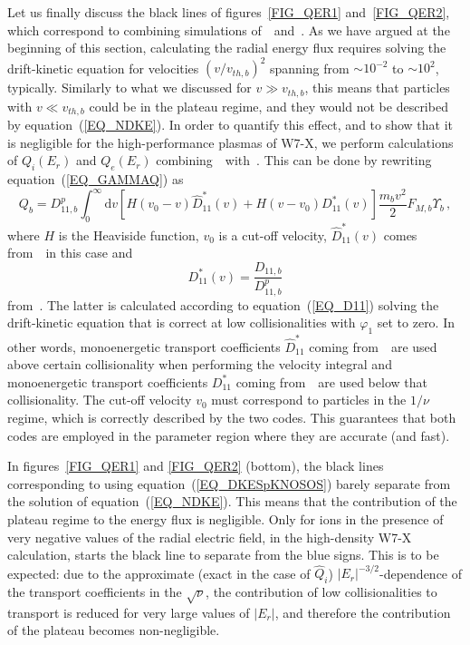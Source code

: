 Let us finally discuss the black lines of figures~\ref{FIG_QER1} and~\ref{FIG_QER2}, which correspond to combining simulations of~\DKES~and~\KNOSOS. As we have argued at the beginning of this section, calculating the radial energy flux requires solving the drift-kinetic equation for velocities $(v/v_{th,b})^2$ spanning from $\sim 10^{-2}$ to $\sim 10^{2}$, typically. Similarly to what we discussed for $v\gg v_{th,b}$, this means that particles with $v\ll v_{th,b}$ could be in the plateau regime, and they would not be described by equation~(\ref{EQ_NDKE}). In order to quantify this effect, and to show that it is negligible for the high-performance plasmas of W7-X, we perform calculations of $Q_i(E_r)$ and $Q_e(E_r)$ combining~\KNOSOS~with~\DKES. This can be done by rewriting equation~(\ref{EQ_GAMMAQ}) as
\begin{equation}
Q_b = D_{11,b}^p\int_0^\infty\mathrm{d} v \left[ H(v_0-v) \hat D^*_{11}(v) + H(v-v_0) D^*_{11}(v) \right] \frac{m_bv^2}{2}  F_{M,b} \Upsilon_b\,,
\label{EQ_DKESpKNOSOS}
\end{equation}
where $H$ is the Heaviside function, $v_0$ is a cut-off velocity, $\hat D^*_{11}(v)$ comes from~\DKES~in this case and
\begin{equation}
D^*_{11}(v) = \frac{D_{11,b}}{D_{11,b}^p}
\end{equation}
from~\KNOSOS. The latter is calculated according to equation~(\ref{EQ_D11}) solving the drift-kinetic equation that is correct at low collisionalities with $\varphi_1$ set to zero. In other words, monoenergetic transport coefficients $\hat D^*_{11}$ coming from~\DKES~are used above certain collisionality when performing the velocity integral and monoenergetic transport coefficients $D^*_{11}$ coming from~\KNOSOS~are used below that collisionality. The cut-off velocity $v_0$ must correspond to particles in the $1/\nu$ regime, which is correctly described by the two codes. This guarantees that both codes are employed in the parameter region where they are accurate (and fast).

In figures~\ref{FIG_QER1} and \ref{FIG_QER2} (bottom), the black lines corresponding to using equation~(\ref{EQ_DKESpKNOSOS}) barely separate from the solution of equation~(\ref{EQ_NDKE}). This means that the contribution of the plateau regime to the energy flux is negligible. Only for ions in the presence of very negative values of the radial electric field, in the high-density W7-X calculation, starts the black line to separate from the blue signs. This is to be expected: due to the approximate (exact in the case of $\hat Q_i$) $|E_r|^{-3/2}$-dependence of the transport coefficients in the $\sqrt{\nu}$, the contribution of low collisionalities to transport is reduced for very large values of $|E_r|$, and therefore the contribution of the plateau becomes non-negligible.

